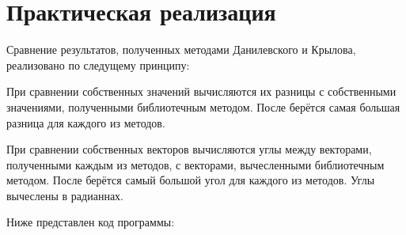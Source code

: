 \documentclass[a4paper, 14pt]{extarticle}
\begin{document}
\section{Практическая реализация}
\par
Сравнение результатов, полученных методами Данилевского и Крылова, реализовано по следущему принципу:
\par
При сравнении собственных значений вычисляются их разницы с собственными значениями, полученными библиотечным методом. После берётся самая большая разница для каждого из методов.
\par
При сравнении собственных векторов вычисляются углы между векторами, полученными каждым из методов, с векторами, вычесленными библиотечным методом. После берётся самый большой угол для каждого из методов. Углы вычеслены в радианнах.
\par
Ниже представлен код программы:
\end{document}
